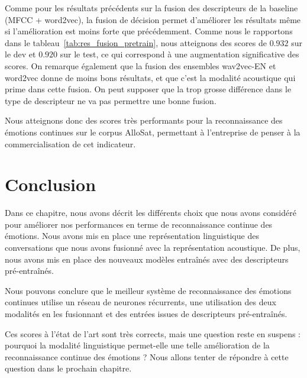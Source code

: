 

Comme pour les résultats précédents sur la fusion des descripteurs de la baseline (MFCC + word2vec), la fusion de décision permet d'améliorer les résultats même si l'amélioration est moins forte que précédemment. Comme nous le rapportons dans le tableau~\ref{tab:res_fusion_pretrain}, nous atteignons des scores de $0.932$ sur le dev et $0.920$ sur le test, ce qui correspond à une augmentation significative des scores. On remarque également que la fusion des ensembles wav2vec-EN et word2vec donne de moins bons résultats, et que c'est la modalité acoustique qui prime dans cette fusion. On peut supposer que la trop grosse différence dans le type de descripteur ne va pas permettre une bonne fusion.

Nous atteignons donc des scores très performants pour la reconnaissance des émotions continues sur le corpus AlloSat, permettant à l'entreprise de penser à la commercialisation de cet indicateur.

\section{Conclusion}
Dans ce chapitre, nous avons décrit les différents choix que nous avons considéré pour améliorer nos performances en terme de reconnaissance continue des émotions. Nous avons mis en place une représentation linguistique des conversations que nous avons fusionné avec la représentation acoustique. De plus, nous avons mis en place des nouveaux modèles entraînés avec des descripteurs pré-entraînés.

Nous pouvons conclure que le meilleur système de reconnaissance des émotions continues utilise un réseau de neurones récurrents, une utilisation des deux modalités en les fusionnant et des entrées issues de descripteurs pré-entraînés.

Ces scores à l'état de l'art sont très corrects, mais une question reste en suspens : pourquoi la modalité linguistique permet-elle une telle amélioration de la reconnaissance continue des émotions ? Nous allons tenter de répondre à cette question dans le prochain chapitre.
